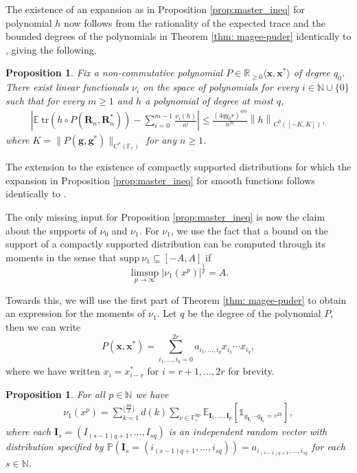 \documentclass[12pt]{article}
\newtheorem{proposition}[theorem]{Proposition}
\renewcommand{\tr}{\mathrm{tr}}
\newcommand{\R}{\mathbb{R}}
\newcommand{\N}{\mathbb{N}}
\renewcommand{\P}{\mathbb{P}}
\newcommand{\E}{\mathbb{E}}
\newcommand{\F}{\mathbb{F}}
\newcommand{\1}{\mathds{1}}
\newcommand{\g}{\mathbf{g}}
\newcommand{\rn}{\mathbf{R}_n}
\begin{document}
The existence of an expansion as in Proposition \ref{prop:master_ineq} for polynomial $h$ now follows from the rationality of the expected trace and the bounded degrees of the polynomials in Theorem \ref{thm: magee-puder} identically to \cite[Section 6]{chennew}, giving the following.

\begin{proposition}
\label{prop: master-polys}
    Fix a non-commutative polynomial $P\in \R_{\geq 0}\langle\mathbf{x},\mathbf{x}^*\rangle$ of degree $q_0$. There exist linear functionals $\nu_i$ on the space of polynomials for every $i\in\N\cup\{0\}$ such that for every $m\geq 1$ and $h$ a polynomial of degree at most $q$,
        \begin{align*}
            \left|\E\ \tr\left(h\circ P\left(\rn,\rn^*\right)\right)-\sum_{i=0}^{m-1}\frac{\nu_i(h)}{n^i}\right| \leq \frac{(4qq_0r)^{4m}}{n^m}\left\|h\right\|_{C^0([-K,K])},
        \end{align*}
    where $K=\|P(\g,\g^*)\|_{C^*(\F_r)}$ for any $n\geq 1$. 
\end{proposition}

The extension to the existence of compactly supported distributions for which the expansion in Proposition \ref{prop:master_ineq} for smooth functions follows identically to \cite[Section 7]{chennew}. 

The only missing input for Proposition \ref{prop:master_ineq} is now the claim about the supports of $\nu_0$ and $\nu_1$. For $\nu_1$, we use the fact that a bound on the support of a compactly supported distribution can be computed through its moments in the sense that \cite[Lemma 4.9]{chennew} $\mathrm{supp}\ \nu_1\subseteq [-A,A]$ if 
    $$\limsup_{p\to\infty}|\nu_1(x^p)|^\frac{1}{p}= A.$$ 

Towards this, we will use the first part of Theorem \ref{thm: magee-puder} to obtain an expression for the moments of $\nu_1$. Let $q$ be the degree of the polynomial $P$, then we can write
    $$P(\mathbf{x},\mathbf{x}^*)=\sum_{i_1,\ldots,i_q=0}^{2r}a_{i_1,\ldots,i_q}x_{i_1}\cdots x_{i_q},$$
where we have written $x_i=x_{i-r}^*$ for $i=r+1,\ldots,2r$ for brevity.

\begin{proposition}
\label{prop: nu_1}
    For all $p\in\N$ we have
    \begin{align*}
        \nu_1(x^p) = \sum_{k=1}^{\lfloor \frac{pq}{2}\rfloor} d(k)\sum_{v\in \F_r^{\mathrm{np}}}\E_{\mathbf{I}_1,\ldots,\mathbf{I}_p}\left[\1_{g_{\mathbf{I}_1}\cdots g_{\mathbf{I}_{p}}=v^{2k}}\right],
    \end{align*}
    where each $\mathbf{I}_s=(I_{(s-1)q+1},\ldots,I_{sq})$ is an independent random vector with distribution specified by $\P(\mathbf{I}_s=(i_{(s-1)q+1},\ldots,i_{sq}))=a_{i_{(s-1)q+1},\ldots,i_{sq}}$ for each $s\in\N$.
\end{proposition}
\end{document}
